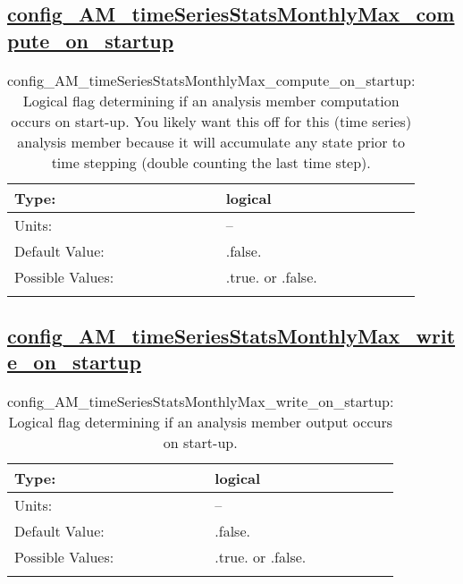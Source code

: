 \subsection[config\_AM\_timeSeriesStatsMonthlyMax\_compute\_on\_startup]{\hyperref[sec:nm_tab_AM_timeSeriesStatsMonthlyMax]{config\_AM\_timeSeriesStatsMonthlyMax\_compute\_on\_startup}}
\label{subsec:nm_sec_config_AM_timeSeriesStatsMonthlyMax_compute_on_startup}
\begin{center}
\begin{longtable}{| p{2.0in} || p{4.0in} |}
    \hline
    Type: & logical \\
    \hline
    Units: & -- \\
    \hline
    Default Value: & .false. \\
    \hline
    Possible Values: & .true. or .false. \\
    \hline
    \caption{config\_AM\_timeSeriesStatsMonthlyMax\_compute\_on\_startup: Logical flag determining if an analysis member computation occurs on start-up. You likely want this off for this (time series) analysis member because it will accumulate any state prior to time stepping (double counting the last time step).}
\end{longtable}
\end{center}
\subsection[config\_AM\_timeSeriesStatsMonthlyMax\_write\_on\_startup]{\hyperref[sec:nm_tab_AM_timeSeriesStatsMonthlyMax]{config\_AM\_timeSeriesStatsMonthlyMax\_write\_on\_startup}}
\label{subsec:nm_sec_config_AM_timeSeriesStatsMonthlyMax_write_on_startup}
\begin{center}
\begin{longtable}{| p{2.0in} || p{4.0in} |}
    \hline
    Type: & logical \\
    \hline
    Units: & -- \\
    \hline
    Default Value: & .false. \\
    \hline
    Possible Values: & .true. or .false. \\
    \hline
    \caption{config\_AM\_timeSeriesStatsMonthlyMax\_write\_on\_startup: Logical flag determining if an analysis member output occurs on start-up.}
\end{longtable}
\end{center}
